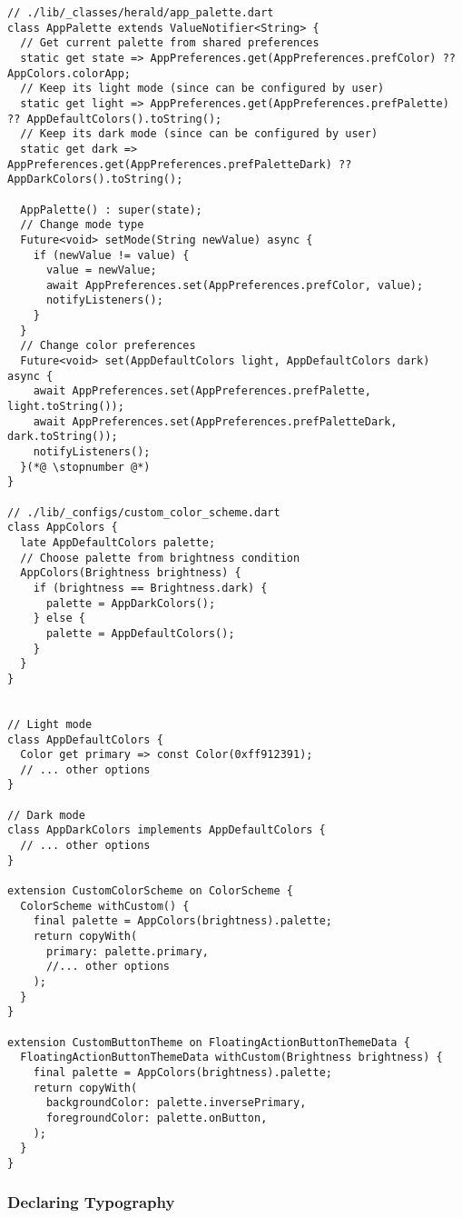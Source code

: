 \begin{lstlisting}
// ./lib/_classes/herald/app_palette.dart
class AppPalette extends ValueNotifier<String> {
  // Get current palette from shared preferences
  static get state => AppPreferences.get(AppPreferences.prefColor) ?? AppColors.colorApp;
  // Keep its light mode (since can be configured by user)
  static get light => AppPreferences.get(AppPreferences.prefPalette) ?? AppDefaultColors().toString();
  // Keep its dark mode (since can be configured by user)
  static get dark => AppPreferences.get(AppPreferences.prefPaletteDark) ?? AppDarkColors().toString();

  AppPalette() : super(state);
  // Change mode type
  Future<void> setMode(String newValue) async {
    if (newValue != value) {
      value = newValue;
      await AppPreferences.set(AppPreferences.prefColor, value);
      notifyListeners();
    }
  }
  // Change color preferences
  Future<void> set(AppDefaultColors light, AppDefaultColors dark) async {
    await AppPreferences.set(AppPreferences.prefPalette, light.toString());
    await AppPreferences.set(AppPreferences.prefPaletteDark, dark.toString());
    notifyListeners();
  }(*@ \stopnumber @*)
}

// ./lib/_configs/custom_color_scheme.dart
class AppColors {
  late AppDefaultColors palette;
  // Choose palette from brightness condition
  AppColors(Brightness brightness) {
    if (brightness == Brightness.dark) {
      palette = AppDarkColors();
    } else {
      palette = AppDefaultColors();
    }
  }
}


// Light mode
class AppDefaultColors {
  Color get primary => const Color(0xff912391);
  // ... other options
}

// Dark mode
class AppDarkColors implements AppDefaultColors {
  // ... other options
}

extension CustomColorScheme on ColorScheme {
  ColorScheme withCustom() {
    final palette = AppColors(brightness).palette;
    return copyWith(
      primary: palette.primary,
      //... other options
    );
  }
}

extension CustomButtonTheme on FloatingActionButtonThemeData {
  FloatingActionButtonThemeData withCustom(Brightness brightness) {
    final palette = AppColors(brightness).palette;
    return copyWith(
      backgroundColor: palette.inversePrimary,
      foregroundColor: palette.onButton,
    );
  }
}
\end{lstlisting}


\subsubsection{Declaring Typography}

